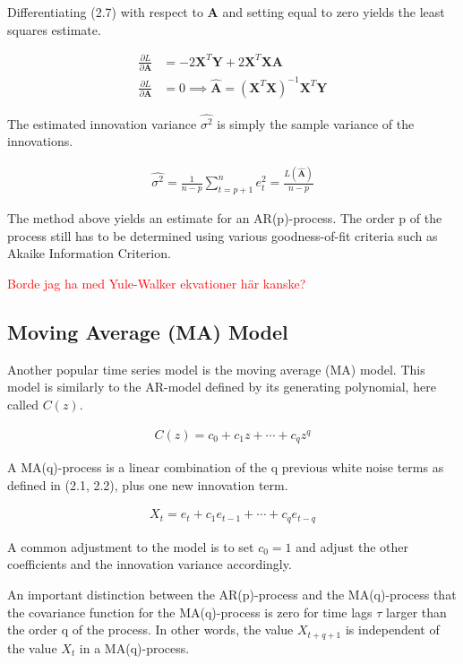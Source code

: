 Differentiating (2.7) with respect to $\mathbf{A}$ and setting equal to zero yields the least squares estimate. 

\begin{align}
    \frac{\partial L}{\partial \mathbf{A}} &= -2 \mathbf{X}^T \mathbf{Y} + 2\mathbf{X}^T \mathbf{X} \mathbf{A} \\
    \frac{\partial L}{\partial \mathbf{A}} &= 0 \implies \hat{\mathbf{A}} = (\mathbf{X}^T \mathbf{X})^{-1} \mathbf{X}^T \mathbf{Y}
 \end{align}

The estimated innovation variance $\hat{\sigma^2}$ is simply the sample variance of the innovations.

\begin{align}
    \hat{\sigma^2} =\frac{1}{n-p} \sum_{t=p+1}^n e_t^2 = \frac{L(\hat{\mathbf{A}})}{n-p}
\end{align}

The method above yields an estimate for an AR(p)-process. The order p of the process still has to be determined using various goodness-of-fit criteria such as Akaike Information Criterion. 


\textcolor{red}{Borde jag ha med Yule-Walker ekvationer här kanske? }

\subsection{Moving Average (MA) Model}

Another popular time series model is the moving average (MA) model. This model is similarly to the AR-model defined by its generating polynomial, here called $C(z)$. 

\begin{align}
    C(z) = c_0 + c_1 z + \cdots + c_q z^q 
\end{align}

A MA(q)-process is a linear combination of the q previous white noise terms as defined in (2.1, 2.2), plus one new innovation term. 

\begin{align}
    X_t = e_t + c_1 e_{t-1} + \cdots + c_q e_{t-q}
\end{align}

A common adjustment to the model is to set $c_0 = 1$ and adjust the other coefficients and the innovation variance accordingly. 

An important distinction between the AR(p)-process and the MA(q)-process that the covariance function for the MA(q)-process is zero for time lags $\tau$ larger than the order q of the process. In other words, the value $X_{t+q + 1}$ is independent of the value $X_t$ in a MA(q)-process. 

